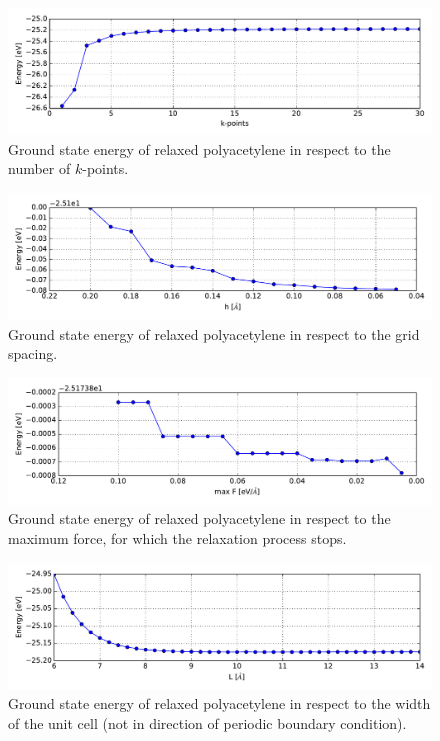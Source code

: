 \begin{figure}[]
	\centering
	\includegraphics[width = 13cm]{Images/polyacetylene/convergence/kpts-energy}
	\caption{Ground state energy of relaxed polyacetylene in respect to the number of $k$-points.}
	\label{image_poly_kpts_energy}
\end{figure}
\begin{figure}[]
	\centering
	\includegraphics[width = 13cm]{Images/polyacetylene/convergence/gridspacing-energy}
	\caption{Ground state energy of relaxed polyacetylene in respect to the grid spacing.}
	\label{image_poly_grid_energy}
\end{figure}
\begin{figure}[]
	\centering
	\includegraphics[width = 13cm]{Images/polyacetylene/convergence/forces-energy}
	\caption{Ground state energy of relaxed polyacetylene in respect to the maximum force, for which the relaxation process stops.}
	\label{image_poly_force_energy}
\end{figure}
\begin{figure}[]
	\centering
	\includegraphics[width = 13cm]{Images/polyacetylene/convergence/unit_cell_width}
	\caption{Ground state energy of relaxed polyacetylene in respect to the width of the unit cell (not in direction of periodic boundary condition).}
	\label{image_poly_width_energy}
\end{figure}
\newpage


